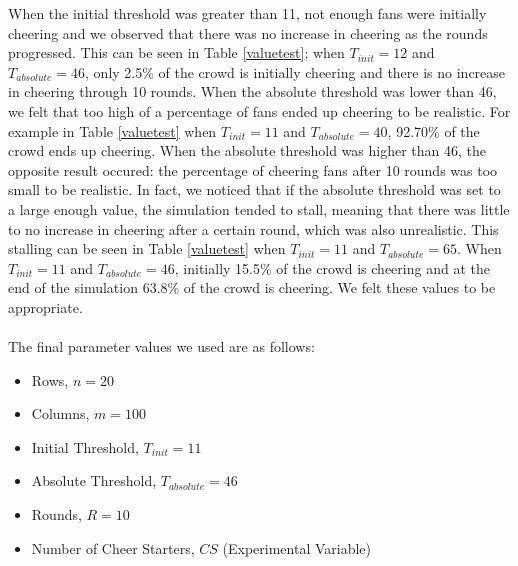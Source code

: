 \documentclass[oneside,12pt]{report}
\begin{document}
When the initial threshold was greater than 11, not enough fans were initially cheering and we observed that there was no increase in cheering as the rounds progressed. This can be seen in Table \ref{valuetest}; when $T_{init}=12$ and $T_{absolute}=46$, only 2.5\% of the crowd is initially cheering and there is no increase in cheering through 10 rounds. When the absolute threshold was lower than 46, we felt that too high of a percentage of fans ended up cheering to be realistic. For example in Table \ref{valuetest} when $T_{init}=11$ and $T_{absolute}=40$, 92.70\% of the crowd ends up cheering. When the absolute threshold was higher than 46, the opposite result occured: the percentage of cheering fans after 10 rounds was too small to be realistic. In fact, we noticed that if the absolute threshold was set to a large enough value, the simulation tended to stall, meaning that there was little to no increase in cheering after a certain round, which was also unrealistic. This stalling can be seen in Table \ref{valuetest} when $T_{init}=11$ and $T_{absolute}=65$. When $T_{init}=11$ and $T_{absolute}=46$, initially 15.5\% of the crowd is cheering and at the end of the simulation 63.8\% of the crowd is cheering. We felt these values to be appropriate.

\paragraph{}
The final parameter values we used are as follows:
\begin{itemize}
		\item Rows, $n=20$
		\item Columns, $m=100$
		\item Initial Threshold, $T_{init}=11$
		\item Absolute Threshold, $T_{absolute}=46$
		\item Rounds, $R=10$
		\item Number of Cheer Starters, $CS$ (Experimental Variable)
\end{itemize}		

\end{document}
